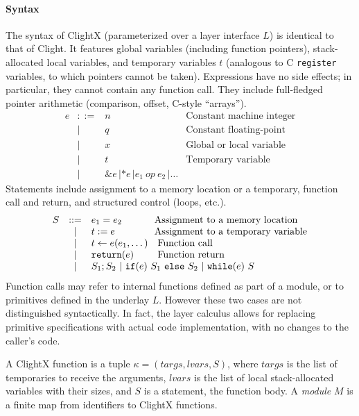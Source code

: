 \paragraph{Syntax} The syntax of ClightX (parameterized over a layer interface
$L$) 
is identical to that of Clight.
It features global variables (including
function pointers), stack-allocated local variables, and
temporary variables $t$ 
(analogous to C \texttt{register} variables, to
which pointers cannot be taken).
Expressions have
no side effects; in particular, they cannot contain any function call.
They include full-fledged pointer arithmetic (comparison, offset, C-style
``arrays'').
\[
\begin{array}{lcll}
e & ::= & n & \text{Constant machine integer} \\
& | & q & \text{Constant floating-point} \\
& | & x & \text{Global or local variable} \\
& | & t & \text{Temporary variable} \\
& | & \texttt{\&}e \, | \texttt{*}e \, | e_1\ \mathit{op}\ e_2 \, | \dots
\end{array}
\]
\noindent{}Statements include assignment to a memory
location or a temporary, function call and return, and 
structured control (loops, etc.).
\[
\begin{array}{lcll}
S & ::= & e_1 = e_2 & \text{\!\!Assignment to a memory location} \\
  & | & t := e & \text{\!\!Assignment to a temporary variable} \\
  & | & t \leftarrow e(e_1, \dots) & \text{Function call} \\
  & | & \texttt{return}(e) & \text{Function return} \\
  & | & \multicolumn{2}{l}{S_1 ; S_2 \ |\ \texttt{if}(e)\ S_1\ \texttt{else}\ S_2\ |\ \texttt{while}(e)\ S} \\
\end{array}
\]
\noindent{}Function calls may refer to internal functions defined as
part of a module, or to primitives defined in the underlay $L$.
However these two cases are not distinguished syntactically.  In fact,
the layer calculus allows for replacing primitive specifications with
actual code implementation, with no changes to the caller's code.

\begin{definition}
A ClightX function is a tuple $\kappa = (\mathit{targs}, \mathit{lvars}, S)$,
where $\mathit{targs}$ is the list of temporaries to receive the
arguments, $\mathit{lvars}$ is the list of local stack-allocated
variables with their sizes, and $S$ is a statement, the function body.
A \emph{module} $M$ is a finite map from identifiers to ClightX functions.
\end{definition}

